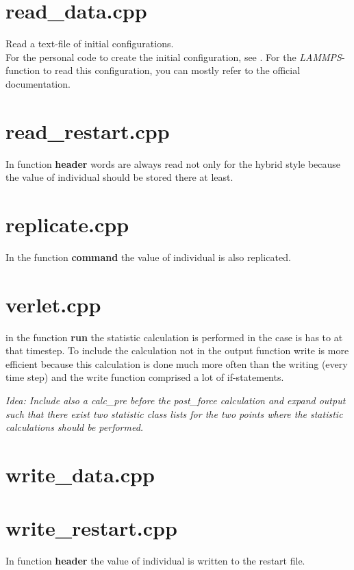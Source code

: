 \documentclass[a4paper,10pt]{scrreprt}
\begin{document}
\section{read\_data.cpp}
Read a text-file of initial configurations.\\For the personal code to create the initial configuration, see . For the \textit{LAMMPS}-function to read this configuration, you can mostly refer to the official documentation.


\section{read\_restart.cpp}

In function \textbf{header} words are always read not only for the hybrid style because the value of individual should be stored there at least.
 
\section{replicate.cpp}

In the function \textbf{command} the value of individual is also replicated.

 
\section{verlet.cpp}

in the function \textbf{run} the statistic calculation is performed in the case is has to at that timestep. To include the calculation not in the output function write is more efficient because this calculation is done much more often than the writing (every time step) and the write function comprised a lot of if-statements.

\textit{Idea: Include also a calc\_pre before the post\_force calculation and expand output such that there exist two statistic class lists for the two points where the statistic calculations should be performed.}


\section{write\_data.cpp}


\section{write\_restart.cpp}

In function \textbf{header} the value of individual is written to the restart file.
\end{document}
